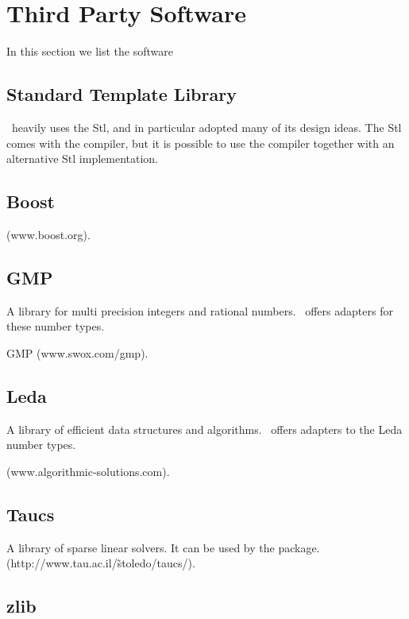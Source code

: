 \section{Third Party Software}

In this section we list the software


\subsection{Standard Template Library \label{thirdparty:stl}}

\cgal\ heavily uses the {\sc Stl}, and in particular adopted
many of its design ideas.   The {\sc Stl} comes with the compiler,
but it is possible to use the compiler together with an
alternative {\sc Stl} implementation.


\subsection{Boost \label{thirdparty:Boost}}

 (www.boost.org).


\subsection{GMP \label{thirdparty:GMP}}

A library for multi precision integers and rational numbers.
\cgal\ offers adapters for these number types.

GMP (www.swox.com/gmp).



\subsection{Leda \label{thirdparty:Leda}}

A library of efficient data structures and algorithms. \cgal\ offers
adapters to the {\sc Leda} number types.

 (www.algorithmic-solutions.com).


\subsection{Taucs \label{thirdparty:Taucs}}

A library of sparse linear solvers.
It can be used by the  package.
 (http://www.tau.ac.il/\~stoledo/taucs/).

\subsection{zlib \label{thirdparty:zlib}}


